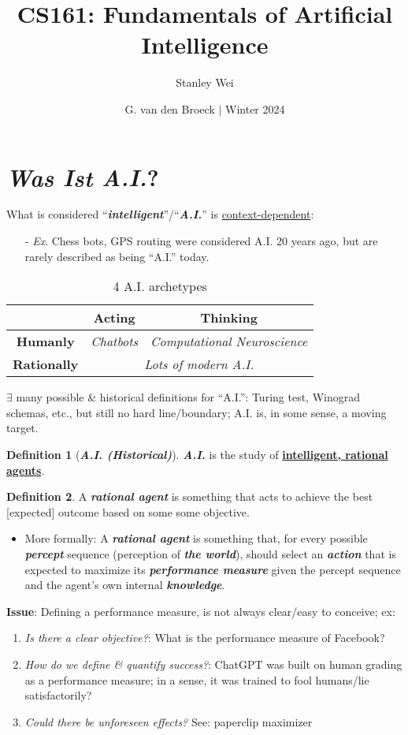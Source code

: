 \documentclass[12pt]{extarticle}
\title{CS161: Fundamentals of Artificial Intelligence}
\author{Stanley Wei}
\date{G. van den Broeck $\vert$ Winter 2024}
\theoremstyle{definition}
\newtheorem*{definition}{Definition}
\theoremstyle{remark}
\newcommand{\pstart}[0]{\noindent}
\newcommand{\term}[1]{\noindent\textbf{\textit{#1}}}
\begin{document}
\section{\textit{Was Ist A.I.}?}
What is considered ``\term{intelligent}''/``\term{A.I.}'' is \ul{context-dependent}: \begin{itemize}
    \item[-] \textit{Ex}. Chess bots, GPS routing were considered A.I. 20 years ago, but are rarely described as being ``A.I.'' today.
\end{itemize}


\begin{table}[h]
    \centering
    \begin{tabular}{|c|c|c|}
        \hline & \textbf{Acting }& \textbf{Thinking} \\
        \hline \textbf{Humanly} & \textit{Chatbots} & \textit{Computational Neuroscience} \\
        \hline \textbf{Rationally} & \multicolumn{2}{|c|}{\textit{Lots of modern A.I.}} \\ \hline
    \end{tabular}
    \caption{4 A.I. archetypes}
\end{table}

\pstart$\exists$ many possible \& historical definitions for ``A.I.'': Turing test, Winograd schemas, etc., but still no hard line/boundary; A.I. is, in some sense, a moving target.

\begin{definition}[\term{A.I. (Historical)}]
    \term{A.I.} is the study of \ul{\textbf{intelligent, rational agents}}.
\end{definition}

\begin{definition}
    A \term{rational agent} is something that acts to achieve the best [expected] outcome based on some some objective. \begin{itemize}
        \item More formally: A \term{rational agent} is something that, for every possible \term{percept} sequence (perception of \term{the world}), should select an \term{action} that is expected to maximize its \term{performance measure} given the percept sequence and the agent's own internal \term{knowledge}.
    \end{itemize}
    
    \vspace{8pt}\pstart\textbf{Issue}: Defining a performance measure, is not always clear/easy to conceive; ex:\begin{enumerate}
        \item \textit{Is there a clear objective?}: What is the performance measure of Facebook?
        \item \textit{How do we define \& quantify success?}: ChatGPT was built on human grading as a performance measure; in a sense, it was trained to fool humans/lie satisfactorily?
        \item \textit{Could there be unforeseen effects?} See: paperclip maximizer
    \end{enumerate}
\end{definition}
\end{document}
